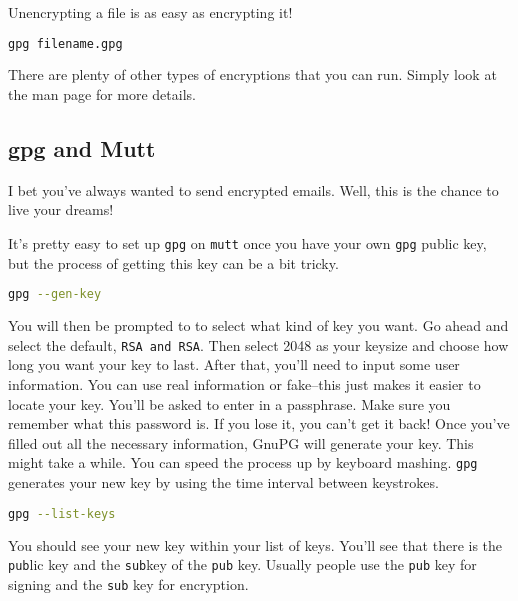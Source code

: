 \documentclass[11pt,a4paper]{article}
\begin{document}
Unencrypting a file is as easy as encrypting it! 

\begin{lstlisting}[basicstyle=\ttfamily, backgroundcolor = \color{lightgray}, language = bash, xleftmargin = 0cm, framexleftmargin = 1em]
gpg filename.gpg
\end{lstlisting}

There are plenty of other types of encryptions that you can run. Simply look at the man page for more details.

\subsection*{gpg and Mutt}

I bet you've always wanted to send encrypted emails. Well, this is the chance to live your dreams!

It's pretty easy to set up \verb|gpg| on \verb|mutt| once you have your own \verb|gpg| public key, but the process of getting this key can be a bit tricky.

\begin{lstlisting}[basicstyle=\ttfamily, backgroundcolor = \color{lightgray}, language = bash, xleftmargin = 0cm, framexleftmargin = 1em]
gpg --gen-key
\end{lstlisting}

You will then be prompted to to select what kind of key you want. Go ahead and select the default, \verb|RSA and RSA|. Then select 2048 as your keysize and choose how long you want your key to last. After that, you'll need to input some user information. You can use real information or fake--this just makes it easier to locate your key. You'll be asked to enter in a passphrase. Make sure you remember what this password is. If you lose it, you can't get it back! Once you've filled out all the necessary information, GnuPG will generate your key. This might take a while. You can speed the process up by keyboard mashing. \verb|gpg| generates your new key by using the time interval between keystrokes.

\begin{lstlisting}[basicstyle=\ttfamily, backgroundcolor = \color{lightgray}, language = bash, xleftmargin = 0cm, framexleftmargin = 1em]
gpg --list-keys
\end{lstlisting}

You should see your new key within your list of keys. You'll see that there is the \verb|pub|lic key and the \verb|sub|key of the \verb|pub| key. Usually people use the \verb|pub| key for signing and the \verb|sub| key for encryption. 
\end{document}
